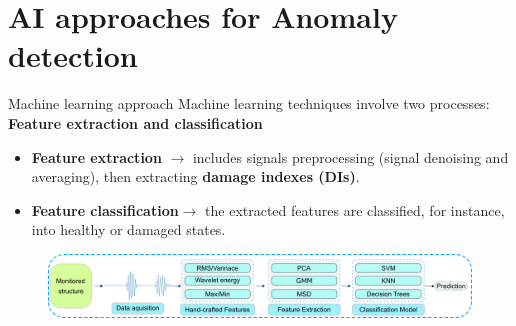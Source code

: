 \documentclass[10pt,aspectratio=169,dvipsnames]{beamer} %
\begin{document}
	\section{AI approaches for Anomaly detection}
	\begin{frame}{Machine learning approach}
		Machine learning techniques involve two processes:
		\alert{\textbf{Feature extraction and classification}}
		\begin{itemize}
			\item \alert{\textbf{Feature extraction}} \(\rightarrow\) includes signals preprocessing (signal denoising and averaging), then extracting \textbf{damage indexes (DIs)}.
			\item \alert{\textbf{Feature classification}}\(\rightarrow\) the extracted features are classified, for instance, into healthy or damaged states.
		\end{itemize}
		\begin{figure}
			\centering
			\includegraphics[width=.95\textwidth]{conventional_ML.png}
		\end{figure}
	\end{frame}
\end{document}
